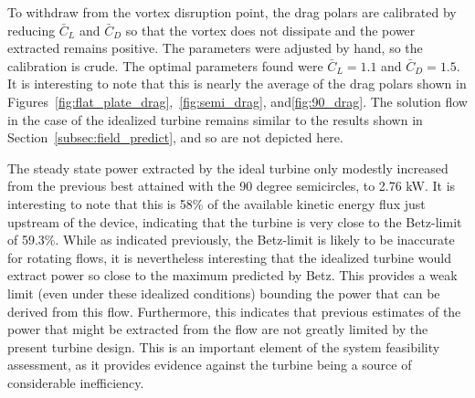 To withdraw from the vortex disruption point, the drag
polars are calibrated by reducing $\bar C_L $ and $\bar C_D$ so that the 
vortex does not dissipate and the power extracted remains positive. The
parameters were adjusted by hand, so the calibration is crude. The
optimal parameters found were $\bar C_L = 1.1$ and $\bar C_D = 1.5$. It
is interesting to note that this is nearly the average of the drag
polars shown in Figures~\ref{fig:flat_plate_drag},~\ref{fig:semi_drag}, 
and\ref{fig:90_drag}. The solution flow in the case of the idealized
turbine remains similar to the results shown in
Section~\ref{subsec:field_predict}, and so are not depicted here. 

The steady state power extracted by the ideal turbine only modestly
increased from the previous best attained with the 90 degree
semicircles, to 2.76 kW. It is interesting to note that this is 58\% of
the available kinetic energy flux just upstream of the device,
indicating that the turbine is very close to the Betz-limit of
59.3\%. While as indicated previously, the Betz-limit is likely to be
inaccurate for rotating flows, it is nevertheless interesting that the
idealized turbine would extract power so close to the maximum predicted by
Betz.  This provides a weak limit (even under these idealized
conditions) bounding the power that can be derived from this
flow. Furthermore, this indicates that previous estimates of the power
that might be extracted from the flow are not greatly limited by the
present turbine design. This is an important element of the system
feasibility assessment, as it provides evidence against the turbine
being a source of considerable inefficiency.  


